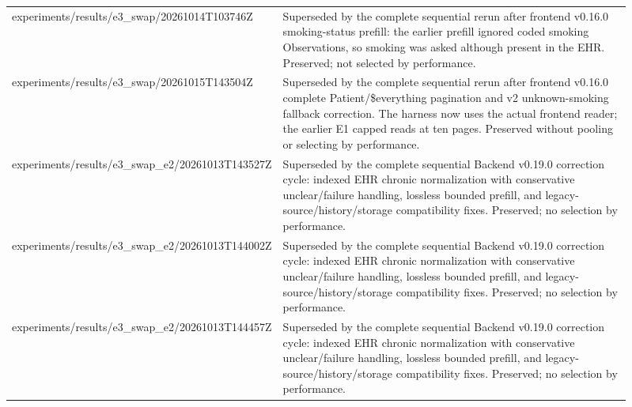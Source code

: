 \begin{longtable}{>{\raggedright\arraybackslash}p{0.31\linewidth}>{\raggedright\arraybackslash}p{0.6\linewidth}}
experiments/\allowbreak{}results/\allowbreak{}e3\_\allowbreak{}swap/\allowbreak{}20261014T103746Z & Superseded by the complete sequential rerun after frontend v0.\allowbreak{}16.\allowbreak{}0 smoking-\allowbreak{}status prefill:\allowbreak{} the earlier prefill ignored coded smoking Observations, so smoking was asked although present in the EHR.\allowbreak{} Preserved; not selected by performance.\allowbreak{} \\
experiments/\allowbreak{}results/\allowbreak{}e3\_\allowbreak{}swap/\allowbreak{}20261015T143504Z & Superseded by the complete sequential rerun after frontend v0.\allowbreak{}16.\allowbreak{}0 complete Patient/\allowbreak{}\$everything pagination and v2 unknown-\allowbreak{}smoking fallback correction.\allowbreak{} The harness now uses the actual frontend reader; the earlier E1 capped reads at ten pages.\allowbreak{} Preserved without pooling or selecting by performance.\allowbreak{} \\
experiments/\allowbreak{}results/\allowbreak{}e3\_\allowbreak{}swap\_\allowbreak{}e2/\allowbreak{}20261013T143527Z & Superseded by the complete sequential Backend v0.\allowbreak{}19.\allowbreak{}0 correction cycle:\allowbreak{} indexed EHR chronic normalization with conservative unclear/\allowbreak{}failure handling, lossless bounded prefill, and legacy-\allowbreak{}source/\allowbreak{}history/\allowbreak{}storage compatibility fixes.\allowbreak{} Preserved; no selection by performance.\allowbreak{} \\
experiments/\allowbreak{}results/\allowbreak{}e3\_\allowbreak{}swap\_\allowbreak{}e2/\allowbreak{}20261013T144002Z & Superseded by the complete sequential Backend v0.\allowbreak{}19.\allowbreak{}0 correction cycle:\allowbreak{} indexed EHR chronic normalization with conservative unclear/\allowbreak{}failure handling, lossless bounded prefill, and legacy-\allowbreak{}source/\allowbreak{}history/\allowbreak{}storage compatibility fixes.\allowbreak{} Preserved; no selection by performance.\allowbreak{} \\
experiments/\allowbreak{}results/\allowbreak{}e3\_\allowbreak{}swap\_\allowbreak{}e2/\allowbreak{}20261013T144457Z & Superseded by the complete sequential Backend v0.\allowbreak{}19.\allowbreak{}0 correction cycle:\allowbreak{} indexed EHR chronic normalization with conservative unclear/\allowbreak{}failure handling, lossless bounded prefill, and legacy-\allowbreak{}source/\allowbreak{}history/\allowbreak{}storage compatibility fixes.\allowbreak{} Preserved; no selection by performance.\allowbreak{} \\

\end{longtable}
